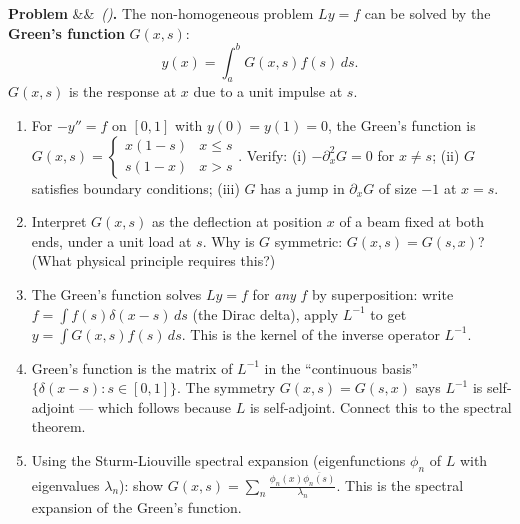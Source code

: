 \documentclass[12pt,a4paper]{article}
\newcounter{problem}
\newenvironment{problem}[1][]{\refstepcounter{problem}\par\vspace{6pt}\noindent\textbf{\color{MidBlue}Problem \theproblem}\ifx&#1&\else\ \textit{(#1)}\fi\textbf{.}\enskip}{\par\vspace{4pt}}
\begin{document}
\begin{problem}
\label{prob:greens}
The non-homogeneous problem $Ly = f$ can be solved by the \textbf{Green's function} $G(x,s)$:
\[
  y(x) = \int_a^b G(x,s)f(s)\,ds.
\]
$G(x,s)$ is the response at $x$ due to a unit impulse at $s$.

\begin{enumerate}[label=(\alph*),topsep=2pt]
  \item For $-y'' = f$ on $[0,1]$ with $y(0)=y(1)=0$, the Green's function is $G(x,s) = \begin{cases}x(1-s)&x\leq s\\s(1-x)&x>s\end{cases}$. Verify: (i) $-\partial_x^2 G = 0$ for $x\neq s$; (ii) $G$ satisfies boundary conditions; (iii) $G$ has a jump in $\partial_x G$ of size $-1$ at $x=s$.
  \item Interpret $G(x,s)$ as the deflection at position $x$ of a beam fixed at both ends, under a unit load at $s$. Why is $G$ symmetric: $G(x,s) = G(s,x)$? (What physical principle requires this?)
  \item The Green's function solves $Ly = f$ for \emph{any} $f$ by superposition: write $f = \int f(s)\delta(x-s)\,ds$ (the Dirac delta), apply $L^{-1}$ to get $y = \int G(x,s)f(s)\,ds$. This is the kernel of the inverse operator $L^{-1}$.
  \item Green's function is the matrix of $L^{-1}$ in the ``continuous basis'' $\{\delta(x-s):s\in[0,1]\}$. The symmetry $G(x,s)=G(s,x)$ says $L^{-1}$ is self-adjoint --- which follows because $L$ is self-adjoint. Connect this to the spectral theorem.
  \item Using the Sturm-Liouville spectral expansion (eigenfunctions $\phi_n$ of $L$ with eigenvalues $\lambda_n$): show $G(x,s) = \sum_n\frac{\phi_n(x)\overline{\phi_n(s)}}{\lambda_n}$. This is the spectral expansion of the Green's function.
\end{enumerate}
\end{problem}
\end{document}
